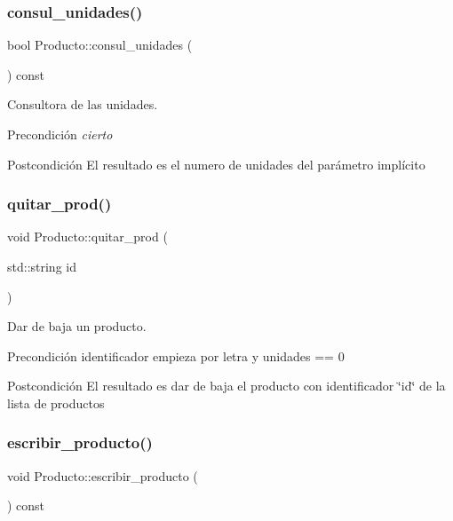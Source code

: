 \subsubsection{\texorpdfstring{consul\+\_\+unidades()}{consul\_unidades()}}
{\footnotesize\ttfamily bool Producto\+::consul\+\_\+unidades (\begin{DoxyParamCaption}{ }\end{DoxyParamCaption}) const}



Consultora de las unidades. 

\begin{DoxyPrecond}{Precondición}
{\itshape cierto} 
\end{DoxyPrecond}
\begin{DoxyPostcond}{Postcondición}
El resultado es el numero de unidades del parámetro implícito 
\end{DoxyPostcond}
\mbox{\label{class_producto_a7223d677ba9a0844072904602fb3b0f1}} 
\subsubsection{\texorpdfstring{quitar\+\_\+prod()}{quitar\_prod()}}
{\footnotesize\ttfamily void Producto\+::quitar\+\_\+prod (\begin{DoxyParamCaption}\item[{std\+::string}]{id }\end{DoxyParamCaption})}



Dar de baja un producto. 

\begin{DoxyPrecond}{Precondición}
identificador empieza por letra y unidades == 0 
\end{DoxyPrecond}
\begin{DoxyPostcond}{Postcondición}
El resultado es dar de baja el producto con identificador \char`\"{}id\char`\"{} de la lista de productos 
\end{DoxyPostcond}
\mbox{\label{class_producto_af3546b67d16efa3ddc66caf069f0c3ec}} 
\subsubsection{\texorpdfstring{escribir\+\_\+producto()}{escribir\_producto()}}
{\footnotesize\ttfamily void Producto\+::escribir\+\_\+producto (\begin{DoxyParamCaption}{ }\end{DoxyParamCaption}) const}



